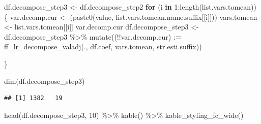 \documentclass[
]{book}
\newenvironment{Shaded}{\begin{snugshade}}{\end{snugshade}}
\newcommand{\ControlFlowTok}[1]{\textcolor[rgb]{0.13,0.29,0.53}{\textbf{#1}}}
\newcommand{\DecValTok}[1]{\textcolor[rgb]{0.00,0.00,0.81}{#1}}
\newcommand{\ErrorTok}[1]{\textcolor[rgb]{0.64,0.00,0.00}{\textbf{#1}}}
\newcommand{\FunctionTok}[1]{\textcolor[rgb]{0.00,0.00,0.00}{#1}}
\newcommand{\NormalTok}[1]{#1}
\newcommand{\OtherTok}[1]{\textcolor[rgb]{0.56,0.35,0.01}{#1}}
\newcommand{\SpecialCharTok}[1]{\textcolor[rgb]{0.00,0.00,0.00}{#1}}
\newcommand{\StringTok}[1]{\textcolor[rgb]{0.31,0.60,0.02}{#1}}
\begin{document}
\begin{Shaded}
\begin{Highlighting}[]
\NormalTok{df.decompose\_step3 }\OtherTok{\textless{}{-}}\NormalTok{ df.decompose\_step2}
\ControlFlowTok{for}\NormalTok{ (i }\ControlFlowTok{in} \DecValTok{1}\SpecialCharTok{:}\FunctionTok{length}\NormalTok{(list.vars.tomean)) \{}
\NormalTok{    var.decomp.cur }\OtherTok{\textless{}{-}}\NormalTok{ (}\FunctionTok{paste0}\NormalTok{(}\StringTok{\textquotesingle{}value\textquotesingle{}}\NormalTok{, list.vars.tomean.name.suffix[[i]]))}
\NormalTok{    vars.tomean }\OtherTok{\textless{}{-}}\NormalTok{ list.vars.tomean[[i]]}
\NormalTok{    var.decomp.cur}
\NormalTok{    df.decompose\_step3 }\OtherTok{\textless{}{-}}\NormalTok{ df.decompose\_step3 }\SpecialCharTok{\%\textgreater{}\%}
      \FunctionTok{mutate}\NormalTok{((}\SpecialCharTok{!!}\NormalTok{var.decomp.cur) }\SpecialCharTok{:}\ErrorTok{=}
               \FunctionTok{ff\_lr\_decompose\_valadj}\NormalTok{(., df.coef, vars.tomean, str.esti.suffix))}

\NormalTok{\}}

\FunctionTok{dim}\NormalTok{(df.decompose\_step3)}
\end{Highlighting}
\end{Shaded}

\begin{verbatim}
## [1] 1382   19
\end{verbatim}

\begin{Shaded}
\begin{Highlighting}[]
\FunctionTok{head}\NormalTok{(df.decompose\_step3, }\DecValTok{10}\NormalTok{) }\SpecialCharTok{\%\textgreater{}\%}
  \FunctionTok{kable}\NormalTok{() }\SpecialCharTok{\%\textgreater{}\%}
  \FunctionTok{kable\_styling\_fc\_wide}\NormalTok{()}
\end{Highlighting}
\end{Shaded}
\end{document}
